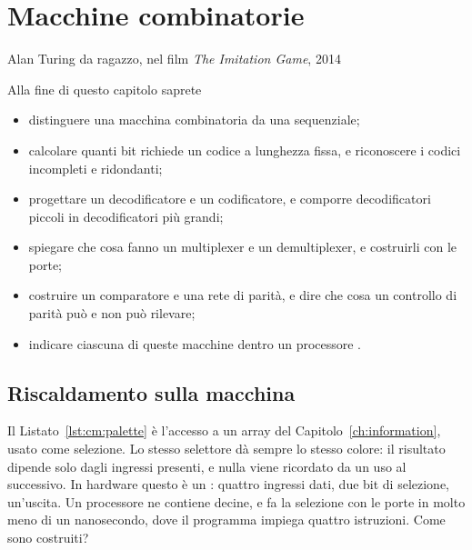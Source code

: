 \chapter{Macchine combinatorie}
\label{ch:combinational}

  {Alan Turing da ragazzo, nel film \emph{The Imitation Game}, 2014}

\begin{chapgoals}
Alla fine di questo capitolo saprete
\begin{itemize}
\item distinguere una macchina combinatoria da una sequenziale;
\item calcolare quanti bit richiede un codice a lunghezza fissa, e riconoscere i codici incompleti e ridondanti;
\item progettare un decodificatore e un codificatore, e comporre decodificatori piccoli in decodificatori più grandi;
\item spiegare che cosa fanno un multiplexer e un demultiplexer, e costruirli con le porte;
\item costruire un comparatore e una rete di parità, e dire che cosa un controllo di parità può e non può rilevare;
\item indicare ciascuna di queste macchine dentro un processore \riscv.
\end{itemize}
\end{chapgoals}


\section{Riscaldamento sulla macchina}


Il Listato~\ref{lst:cm:palette} è l'accesso a un array del
Capitolo~\ref{ch:information}, usato come selezione. Lo stesso selettore dà
sempre lo stesso colore: il risultato dipende solo dagli ingressi presenti, e
nulla viene ricordato da un uso al successivo. In hardware questo è un
: quattro ingressi dati, due bit di selezione, un'uscita. Un
processore ne contiene decine, e fa la selezione con le porte in molto meno di
un nanosecondo, dove il programma impiega quattro istruzioni. Come sono
costruiti?

